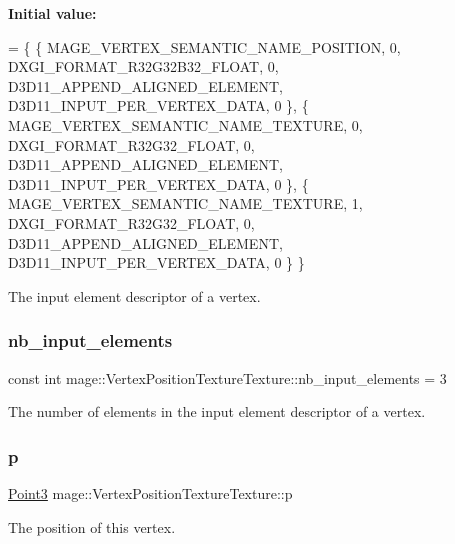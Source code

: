 {\bfseries Initial value\+:}
\begin{DoxyCode}
= \{
        \{ MAGE\_VERTEX\_SEMANTIC\_NAME\_POSITION, 0, DXGI\_FORMAT\_R32G32B32\_FLOAT,    0, 
      D3D11\_APPEND\_ALIGNED\_ELEMENT, D3D11\_INPUT\_PER\_VERTEX\_DATA, 0 \},
        \{ MAGE\_VERTEX\_SEMANTIC\_NAME\_TEXTURE,  0, DXGI\_FORMAT\_R32G32\_FLOAT,       0, 
      D3D11\_APPEND\_ALIGNED\_ELEMENT, D3D11\_INPUT\_PER\_VERTEX\_DATA, 0 \},
        \{ MAGE\_VERTEX\_SEMANTIC\_NAME\_TEXTURE,  1, DXGI\_FORMAT\_R32G32\_FLOAT,       0, 
      D3D11\_APPEND\_ALIGNED\_ELEMENT, D3D11\_INPUT\_PER\_VERTEX\_DATA, 0 \}
    \}
\end{DoxyCode}
The input element descriptor of a vertex. \hypertarget{structmage_1_1_vertex_position_texture_texture_ac15391bbc084b6843ba3b9696b7f502a}{}\label{structmage_1_1_vertex_position_texture_texture_ac15391bbc084b6843ba3b9696b7f502a} 
\subsubsection{\texorpdfstring{nb\+\_\+input\+\_\+elements}{nb\_input\_elements}}
{\footnotesize\ttfamily const int mage\+::\+Vertex\+Position\+Texture\+Texture\+::nb\+\_\+input\+\_\+elements = 3\hspace{0.3cm}{\ttfamily [static]}}

The number of elements in the input element descriptor of a vertex. \hypertarget{structmage_1_1_vertex_position_texture_texture_aed106149eda65a20e60ebc3b93535270}{}\label{structmage_1_1_vertex_position_texture_texture_aed106149eda65a20e60ebc3b93535270} 
\subsubsection{\texorpdfstring{p}{p}}
{\footnotesize\ttfamily \hyperlink{structmage_1_1_point3}{Point3} mage\+::\+Vertex\+Position\+Texture\+Texture\+::p}

The position of this vertex. \hypertarget{structmage_1_1_vertex_position_texture_texture_a96be20a1f6ec9b9b74875099eef80f08}{}\label{structmage_1_1_vertex_position_texture_texture_a96be20a1f6ec9b9b74875099eef80f08} 
